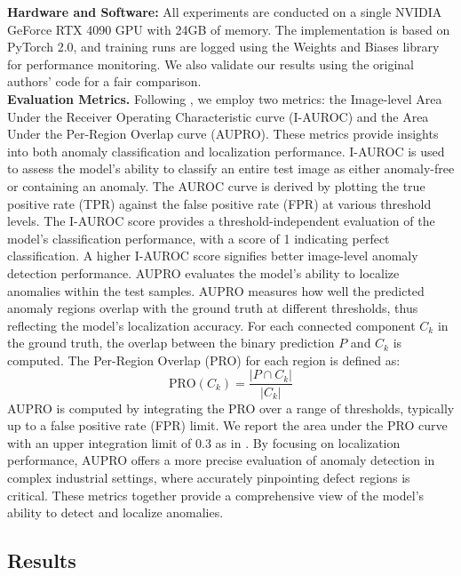 \textbf{Hardware and Software:} All experiments are conducted on a single NVIDIA GeForce RTX 4090 GPU with 24GB of memory. The implementation is based on PyTorch 2.0, and training runs are logged using the Weights and Biases library for performance monitoring. We also validate our results using the original authors' code for a fair comparison. \\

\noindent \textbf{Evaluation Metrics.} Following \cite{bergmann2022mvtec, wang2023multimodal}, we employ two metrics: the Image-level Area Under the Receiver Operating Characteristic curve (I-AUROC) and the Area Under the Per-Region Overlap curve (AUPRO). These metrics provide insights into both anomaly classification and localization performance. I-AUROC is used to assess the model's ability to classify an entire test image as either anomaly-free or containing an anomaly. The AUROC curve is derived by plotting the true positive rate (TPR) against the false positive rate (FPR) at various threshold levels. The I-AUROC score provides a threshold-independent evaluation of the model's classification performance, with a score of 1 indicating perfect classification. A higher I-AUROC score signifies better image-level anomaly detection performance. AUPRO evaluates the model's ability to localize anomalies within the test samples. AUPRO measures how well the predicted anomaly regions overlap with the ground truth at different thresholds, thus reflecting the model's localization accuracy. For each connected component \( C_k \) in the ground truth, the overlap between the binary prediction \( P \) and \( C_k \) is computed. The Per-Region Overlap (PRO) for each region is defined as:
\begin{equation}
    \text{PRO}(C_k) = \frac{|P \cap C_k|}{|C_k|}
\end{equation}
AUPRO is computed by integrating the PRO over a range of thresholds, typically up to a false positive rate (FPR) limit.  We report the area under the PRO curve with an upper integration limit of 0.3 as in \cite{bergmann2022mvtec}. By focusing on localization performance, AUPRO offers a more precise evaluation of anomaly detection in complex industrial settings, where accurately pinpointing defect regions is critical. These metrics together provide a comprehensive view of the model's ability to detect and localize anomalies.

\subsection*{Results}

